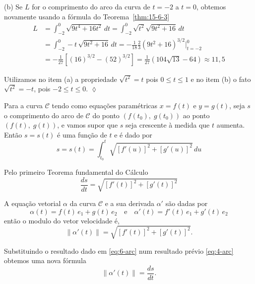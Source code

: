 (b) Se \(L\)  for o comprimento do arco da curva de \(t = -2\) a \(t = 0\), obtemos novamente usando a fórmula do Teorema~\ref{thm:15-6-3}
\begin{align*}
  L & = \int_{-2}^{0}\sqrt{9t^{4}+16t^{2}}\, dt=\int_{-2}^{0}\sqrt{t^{2}}\sqrt{9t^{2}+16}\, dt \\[2ex]
    & = \int_{-2}^{0}-t\,\sqrt{9t^{2}+16}\, dt=
-\frac{1}{18}\frac{2}{3}\left(9t^{2}+16\right)^{3/2}\Bigg\vert_{t=-2}^{0}\\[2ex]
&=-\frac{1}{27}\left[(16)^{3/2}-(52)^{3/2}\right]= \frac{1}{27}\left(104\sqrt{13}-64\right)\approx 11,5
\end{align*}

Utilizamos no item (a) a propriedade \(\sqrt{t^{2}}=t\) pois \( 0 \leq t \leq 1 \) e no item (b) o fato \( \sqrt{t^{2}}=-t\), pois \( -2 \leq t \leq 0\). \hfill \(\lozenge\)



Para a curva \(\mathcal{C}\) tendo como equações paramétricas \(x=f(t)\) e \(y=g(t)\), seja \(s\)  o comprimento do
arco de \( \mathcal{C}\)  do ponto \((f(t_{0}),\; g (t_{0}))\) ao ponto \((f(t),\; g (t))\), e vamos supor que \(s\)
seja crescente  à medida que \(t\) aumenta. Então \(s=s(t)\) é uma função de \(t\) e é dado por
\begin{equation*}
  s=s(t)=\int_{t_{0}}^{t}\sqrt{[f'(u)]^{2}+[g'(u)]^{2}}\,du
\end{equation*}

Pelo primeiro Teorema fundamental do Cálculo
\begin{equation}\label{eq:4-arc}
  \frac{ds}{dt}=\sqrt{[f'(t)]^{2}+[g'(t)]^{2}}
\end{equation}

A equação vetorial \(\alpha\) da curva \( \mathcal{C}\) e a sua derivada \(\alpha'\) são dadas por
\begin{equation}\label{eq:5-arc}
\alpha(t)=f(t)\, e_{1}+g(t)\, e_{2}\quad \text{e}\quad \alpha'(t)=f'(t)\, e_{1}+g'(t)\, e_{2}
\end{equation}
então o modulo do vetor velocidade é,
\begin{equation}\label{eq:6-arc}
  \|\alpha'(t)\|= \sqrt{[f'(t)]^{2}+[g'(t)]^{2}}.
\end{equation}

Substituindo o resultado dado em \eqref{eq:6-arc} num resultado prévio \eqref{eq:4-arc} obtemos uma nova fórmula
\begin{equation*}
  \boxed{\quad
  \|\alpha'(t)\|=\frac{ds}{dt}. \quad }
\end{equation*}

